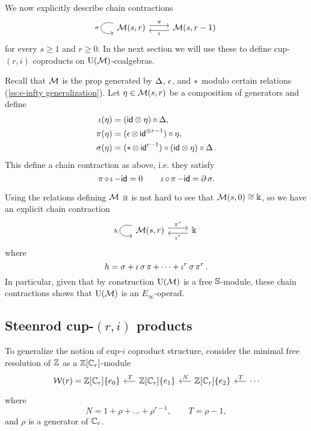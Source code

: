 We now explicitly describe chain contractions
\[
\begin{tikzcd}
\arrow[loop, distance=2em, in=195, out=165, "\sigma"'] \Med(s,r) \arrow[r, shift left=3pt, "\proj"] &
\Med(s,r-1) \arrow[l, shift left=3pt, "\incl"]
\end{tikzcd}
\]
for every $s \geq 1$ and $r \geq 0$.
In the next section we will use these to define cup-$(r, i)$ coproducts on $\operatorname{\mathrm{U}(\mathcal{M})}$-coalgebras.

Recall that $\operatorname{\mathcal{M}}$ is the prop generated by $\operatorname{\Delta}$, $\operatorname{\epsilon}$, and $\operatorname{\ast}$ modulo certain relations (\cref{ss:e-infty generalization}).
Let $\eta \in \operatorname{\mathcal{M}}(s,r)$ be a composition of generators and define
\begin{align*}
\operatorname{\iota}(\eta) & = (\mathsf{id} \otimes \eta) \circ \operatorname{\Delta}, \\
\operatorname{\pi}(\eta) & = (\operatorname{\epsilon} \otimes \, \mathsf{id}^{\otimes r-1}) \circ \eta, \\
\sigma(\eta) & = (\operatorname{\ast} \otimes \, \mathsf{id}^{r-1}) \circ (\mathsf{id} \otimes \eta) \circ \operatorname{\Delta}.
\end{align*}
This define a chain contraction as above, i.e. they satisfy
\[
\operatorname{\pi} \circ \operatorname{\iota} - \mathsf{id} = 0
\qquad
\operatorname{\iota} \circ \operatorname{\pi} - \mathsf{id} = \operatorname{\partial} \sigma.
\]

Using the relations defining $\operatorname{\mathcal{M}}$ it is not hard to see that $\operatorname{\mathcal{M}}(s,0) \cong \Bbbk$, so we have an explicit chain contraction
\[
\begin{tikzcd}
\arrow[loop, distance=2em, in=195, out=165, "h"'] \Med(s,r) \arrow[r, shift left=3pt, "\proj^r"] &
\k \arrow[l, shift left=3pt, "\incl^r"]
\end{tikzcd}
\]
where
\begin{equation} \label{e:big chain contraction}
h = \sigma + \operatorname{\iota} \sigma \operatorname{\pi} + \dots + \operatorname{\iota}^{r} \sigma \operatorname{\pi}^{r}.
\end{equation}
In particular, given that by construction $\operatorname{\mathrm{U}(\mathcal{M})}$ is a free $\mathbb{S}$-module, these chain contractions shows that $\operatorname{\mathrm{U}(\mathcal{M})}$ is an $E_\infty$-operad.

\subsection{Steenrod cup-$(r,i)$ products} \label{ss:higher cup-i coproducts}

To generalize the notion of cup-$i$ coproduct structure, consider the minimal free resolution of $\mathbb{Z}$ as a $\mathbb{Z}[\mathbb{C}_r]$-module
\begin{equation} \label{e:minimal resolution r>2}
\begin{tikzcd} [column sep = .5cm]
\mathcal W(r) = \Z[\Cyc_r]\{e_0\} & \arrow[l, "\,T"'] \Z[\Cyc_r]\{e_1\} & \arrow[l, "\,N"'] \Z[\Cyc_r]\{e_2\} & \arrow[l, "\,T"'] \cdots
\end{tikzcd}
\end{equation}
where
\begin{equation} \label{e:trnaposition and norm maps}
N = 1 + \rho + \dots + \rho^{r-1}, \qquad
T = \rho - 1,
\end{equation}
and $\rho$ is a generator of $\mathbb{C}_r$.

